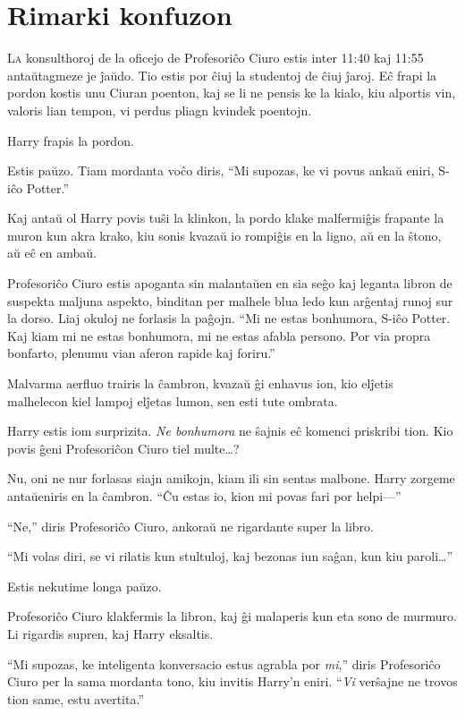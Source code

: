 \chapter{Rimarki konfuzon}

\lettrine{L}{a} konsulthoroj de la oficejo de Profesoriĉo Ciuro estis inter
11:40 kaj 11:55 antaŭtagmeze je ĵaŭdo. Tio estis por ĉiuj la studentoj de ĉiuj
ĵaroj. Eĉ frapi la pordon kostis unu Ciuran poenton, kaj se li ne pensis ke la
kialo, kiu alportis vin, valoris lian tempon, vi perdus pliagn kvindek poentojn.

Harry frapis la pordon.

Estis paŭzo. Tiam mordanta voĉo diris, ``Mi supozas, ke vi povus ankaŭ
eniri, S-iĉo Potter.''

Kaj antaŭ ol Harry povis tuŝi la klinkon, la pordo klake malfermiĝis frapante la
muron kun akra krako, kiu sonis kvazaŭ io rompiĝis en la ligno, aŭ en la ŝtono,
aŭ eĉ en ambaŭ.

Profesoriĉo Ciuro estis apoganta sin malantaŭen en sia seĝo kaj leganta libron
de suspekta maljuna aspekto, binditan per malhele blua ledo kun arĝentaj runoj
sur la dorso. Liaj okuloj ne forlasis la paĝojn. ``Mi ne estas bonhumora, S-iĉo
Potter. Kaj kiam mi ne estas bonhumora, mi ne estas afabla persono. Por via
propra bonfarto, plenumu vian aferon rapide kaj foriru.''

Malvarma aerfluo trairis la ĉambron, kvazaŭ ĝi enhavus ion, kio elĵetis
malhelecon kiel lampoj elĵetas lumon, sen esti tute ombrata.

Harry estis iom surprizita. \emph{Ne bonhumora} ne ŝajnis eĉ komenci priskribi
tion. Kio povis ĝeni Profesoriĉon Ciuro tiel multe\ldots{}?

Nu, oni ne nur forlasas siajn amikojn, kiam ili sin sentas malbone. Harry
zorgeme antaŭeniris en la ĉambron. ``Ĉu estas io, kion mi povas fari por
helpi—''

``Ne,'' diris Profesoriĉo Ciuro, ankoraŭ ne rigardante super la libro.

``Mi volas diri, se vi rilatis kun stultuloj, kaj bezonas iun saĝan, kun kiu
paroli\ldots{}''

Estis nekutime longa paŭzo.

Profesoriĉo Ciuro klakfermis la libron, kaj ĝi malaperis kun eta sono de
murmuro. Li rigardis supren, kaj Harry eksaltis.

``Mi supozas, ke inteligenta konversacio estus agrabla por \emph{mi},'' diris
Profesoriĉo Ciuro per la sama mordanta tono, kiu invitis Harry'n eniri.
``\emph{Vi} verŝajne ne trovos tion same, estu avertita.''

